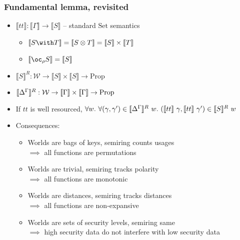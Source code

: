 \documentclass[fleqn]{beamer}
\begin{document}
  \begin{frame}
    \frametitle{Fundamental lemma, revisited}
    \begin{itemize} \pause
    \item $\llbracket tt \rrbracket : \llbracket \Gamma \rrbracket \to
      \llbracket S \rrbracket$ -- standard $ \mathrm{Set} $ semantics \pause
      \begin{itemize}
      \item $ \llbracket \withT{S}{T} \rrbracket =
        \llbracket \tensor{S}{T} \rrbracket =
        \llbracket S \rrbracket \times \llbracket T \rrbracket $ \pause
      \item $ \llbracket \excl{\rho}{S} \rrbracket = \llbracket S \rrbracket $ \pause
      \end{itemize}
    \item $\llbracket S \rrbracket^R : \mathcal{W} \to
      \llbracket S \rrbracket \times \llbracket S \rrbracket \to \mathrm{Prop}$
    \item $\llbracket {\Delta}^{\Gamma} \rrbracket^R : \mathcal{W} \to
      \llbracket \Gamma \rrbracket \times \llbracket \Gamma \rrbracket \to \mathrm{Prop}$ \pause
    \item If $tt$ is well resourced, $\forall w.~\forall(\gamma, \gamma') \in \llbracket {\Delta}^{\Gamma}
      \rrbracket^R~w.~(\llbracket tt \rrbracket~\gamma, \llbracket tt
      \rrbracket~\gamma') \in \llbracket S \rrbracket^R~w$ \pause
    \item Consequences:
      \begin{itemize}
      \item Worlds are bags of keys, semiring counts usages \\
        $\implies$ all functions are permutations
      \item Worlds are trivial, semiring tracks polarity \\
        $\implies$ all functions are monotonic \pause
      \item Worlds are distances, semiring tracks distances \\
        $\implies$ all functions are non-expansive \pause
      \item Worlds are sets of security levels, semiring same \\
        $\implies$ high security data do not interfere with low security data
      \end{itemize}
    \end{itemize}
  \end{frame}
\end{document}
